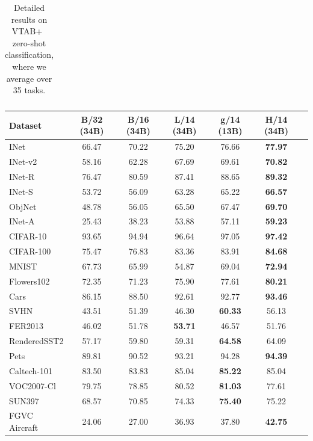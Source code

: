 \begin{appendix}
\begin{table}[!tbh]
\begin{tabular}{@{}lclll@{}}
\end{tabular}


\caption{Detailed results on VTAB+~\cite{Schuhmann2022} zero-shot classification, where we average over 35 tasks. 
}
\label{table:zeroshot_vtab_plus}
\end{table}


\begin{table}[ht]
\centering
\small
{}
\begin{tabular}{@{}lcccccc@{}}
\toprule
Dataset & B/32 (34B)&B/16 (34B)&L/14 (34B)&g/14 (13B)&H/14 (34B)\\  \midrule
INet & 66.47 &70.22 &75.20 &76.66 &\textbf{77.97 }\\
INet-v2 & 58.16 &62.28 &67.69 &69.61 &\textbf{70.82 }\\
INet-R & 76.47 &80.59 &87.41 &88.65 &\textbf{89.32 }\\
INet-S & 53.72 &56.09 &63.28 &65.22 &\textbf{66.57 }\\
ObjNet & 48.78 &56.05 &65.50 &67.47 &\textbf{69.70 }\\
INet-A & 25.43 &38.23 &53.88 &57.11 &\textbf{59.23 }\\
CIFAR-10 & 93.65 &94.94 &96.64 &97.05 &\textbf{97.42 }\\
CIFAR-100 & 75.47 &76.83 &83.36 &83.91 &\textbf{84.68 }\\
MNIST & 67.73 &65.99 &54.87 &69.04 &\textbf{72.94 }\\
Flowers102 & 72.35 &71.23 &75.90 &77.61 &\textbf{80.21 }\\
Cars & 86.15 &88.50 &92.61 &92.77 &\textbf{93.46 }\\
SVHN & 43.51 &51.39 &46.30 &\textbf{60.33 }&56.13 \\
FER2013 & 46.02 &51.78 &\textbf{53.71 }&46.57 &51.76 \\
RenderedSST2 & 57.17 &59.80 &59.31 &\textbf{64.58 }&64.09 \\
Pets & 89.81 &90.52 &93.21 &94.28 &\textbf{94.39 }\\
Caltech-101 & 83.50 &83.83 &85.04 &\textbf{85.22 }&85.04 \\
VOC2007-Cl & 79.75 &78.85 &80.52 &\textbf{81.03 }&77.61 \\
SUN397 & 68.57 &70.85 &74.33 &\textbf{75.40 }&75.22 \\
FGVC Aircraft & 24.06 &27.00 &36.93 &37.80 &\textbf{42.75 }\\

\end{tabular}
\end{table}
\end{appendix}
